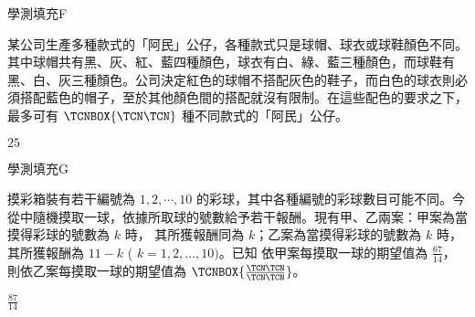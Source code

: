     \begin{QUESTION}
        \begin{ExamInfo}{96}{學測}{填充}{F}
        \end{ExamInfo}
        \begin{ExamAnsRateInfo}{26}{38}{28}{12}
        \end{ExamAnsRateInfo}
        \begin{QBODY}
            某公司生產多種款式的「阿民」公仔，各種款式只是球帽、球衣或球鞋顏色不同。其中球帽共有黑、灰、紅、藍四種顏色，球衣有白、綠、藍三種顏色，而球鞋有黑、白、灰三種顏色。公司決定紅色的球帽不搭配灰色的鞋子，而白色的球衣則必須搭配藍色的帽子，至於其他顏色間的搭配就沒有限制。在這些配色的要求之下，最多可有 $\TCNBOX{\TCN\TCN}$ 種不同款式的「阿民」公仔。
        \end{QBODY}
        \begin{QFROMS}
        \end{QFROMS}
        \begin{QTAGS}\end{QTAGS}
        \begin{QANS}
            $25$
        \end{QANS}
        \begin{QSOLLIST}
        \end{QSOLLIST}
        \begin{QEMPTYSPACE}
        \end{QEMPTYSPACE}
    \end{QUESTION}
    \begin{QUESTION}
        \begin{ExamInfo}{96}{學測}{填充}{G}
        \end{ExamInfo}
        \begin{ExamAnsRateInfo}{19}{39}{13}{5}
        \end{ExamAnsRateInfo}
        \begin{QBODY}
            摸彩箱裝有若干編號為 $1, 2, \cdots ,10$ 的彩球，其中各種編號的彩球數目可能不同。今從中隨機摸取一球，依據所取球的號數給予若干報酬。現有甲、乙兩案：甲案為當摸得彩球的號數為 $k$ 時， 其所獲報酬同為 $k$；乙案為當摸得彩球的號數為 $k$ 時，其所獲報酬為 $11- k$ ( $k = 1, 2, \dots ,10 )$。已知
依甲案每摸取一球的期望值為 $\frac{67}{14}$，則依乙案每摸取一球的期望值為 
$\TCNBOX{\frac{\TCN\TCN}{\TCN\TCN}}$。
        \end{QBODY}
        \begin{QFROMS}
        \end{QFROMS}
        \begin{QTAGS}\end{QTAGS}
        \begin{QANS}
            $\frac{87}{14}$
        \end{QANS}
        \begin{QSOLLIST}
        \end{QSOLLIST}
        \begin{QEMPTYSPACE}
        \end{QEMPTYSPACE}
    \end{QUESTION}
